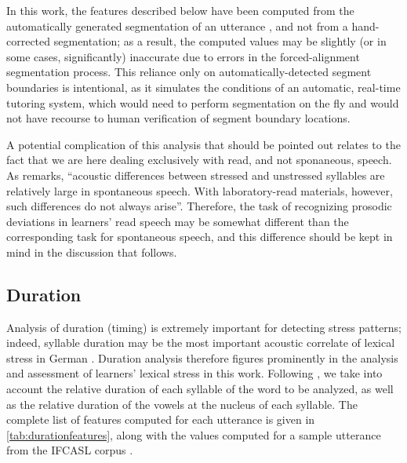 In this work, the features described below have been computed from the automatically generated segmentation of an utterance , and not from a hand-corrected segmentation; as a result, the computed values may be slightly (or in some cases, significantly) inaccurate due to errors in the forced-alignment segmentation process. This reliance only on automatically-detected segment boundaries is intentional, as it simulates the conditions of an automatic, real-time tutoring system, which would need to perform segmentation on the fly and would not have recourse to human verification of segment boundary locations.

	A potential complication of this analysis that should be pointed out relates to the fact that we are here dealing exclusively with read, and not sponaneous, speech. As \textcite[p.~275]{Cutler2005} remarks, ``acoustic differences between stressed and unstressed syllables are relatively large in spontaneous speech. With laboratory-read materials, however, such differences do not always arise''. Therefore, the task of recognizing prosodic deviations in learners' read speech may be somewhat different than the corresponding task for spontaneous speech, and this difference should be kept in mind in the discussion that follows.

	\subsection{Duration}
	\label{sec:prosody:duration}
	Analysis of duration (timing) is extremely important for detecting stress patterns;
indeed, syllable duration may be the most important acoustic correlate of lexical stress in German \citep{Dogil1999}.
Duration analysis therefore figures prominently in the analysis and assessment of learners' lexical stress in this work. Following \textcite{Bonneau2011}, we take into account the relative duration of each syllable of the word to be analyzed, as well as the relative duration of the vowels at the nucleus of each syllable. 
The complete list of features computed for each utterance is given in \cref{tab:durationfeatures}, 
along with the values computed for a sample utterance from the IFCASL corpus . 



